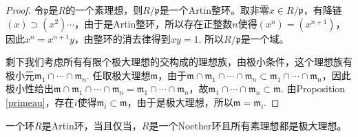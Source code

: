 \begin{proof}
	令$\mathfrak{p}$是$R$的一个素理想，则$R/\mathfrak{p}$是一个Artin整环。取非零$x\in R/\mathfrak{p}$，有降链$(x)\supset (x^2)\cdots$，由于是Artin整环，所以存在正整数$n$使得$(x^n)=(x^{n+1})$，因此$x^n=x^{n+1}y$，由整环的消去律得到$xy=1$. 所以$R/\mathfrak{p}$是一个域。

	剩下我们考虑所有有限个极大理想的交构成的理想族，由极小条件，这个理想族有极小元$\mathfrak{m}_1\cap \cdots \cap \mathfrak{m}_n$. 任取极大理想$\mathfrak{m}$，由于$\mathfrak{m}\cap\mathfrak{m}_1\cap \cdots \cap \mathfrak{m}_n\subset \mathfrak{m}_1\cap \cdots \cap \mathfrak{m}_n$，因此极小性给出$\mathfrak{m}\cap\mathfrak{m}_1\cap \cdots \cap \mathfrak{m}_n=\mathfrak{m}_1\cap \cdots \cap \mathfrak{m}_n$，故$\mathfrak{m}_1\cap \cdots \cap \mathfrak{m}_n\subset \mathfrak{m}$. 由Proposition \eqref{primeau}，存在$i$使得$\mathfrak{m}_i\subset \mathfrak{m}$，由于是极大理想，所以$\mathfrak{m}=\mathfrak{m}_i$.
\end{proof}

\begin{pro}
一个环$R$是Artin环，当且仅当，$R$是一个Noether环且所有素理想都是极大理想。
\end{pro}

